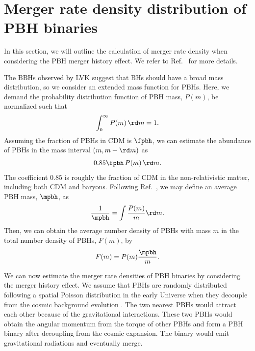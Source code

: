 \documentclass[
reprint,           %
superscriptaddress,%
amsmath,           %
amssymb,           %
aps,               %
prd,               %
notitlepage,       %
longbibliography,  %
floatfix,          %
nofootinbib,
]{revtex4-1}
\def\e{\begin{equation}}
\def\q{\end{equation}}
\begin{document}
\section{\label{merger}Merger rate density distribution of PBH binaries}

In this section, we will outline the calculation of merger rate density when considering the PBH merger history effect. We refer to Ref.~\cite{Liu:2019rnx} for more details.

The BBHs observed by LVK suggest that BHs should have a broad mass distribution, so we consider an extended mass function for PBHs. Here, we demand the probability distribution function of PBH mass, $P(m)$, be normalized such that
\e\label{norm}
\int_{0}^{\infty} P(m)\, \rd m = 1.
\q 
Assuming the fraction of PBHs in CDM is $\fpbh$, we can estimate the abundance of PBHs in the mass interval $(m, m+\rd m)$ as \cite{Chen:2018rzo}
\e 
0.85 \fpbh\, P(m)\, \rd m.
\q 
The coefficient $0.85$ is roughly the fraction of CDM in the non-relativistic matter, including both CDM and baryons. Following Ref.~\cite{Liu:2019rnx}, we may define an average PBH mass, $\mpbh$, as
\e\label{mpbh}
\frac{1}{\mpbh} = \int \frac{P(m)}{m} \rd m.
\q 
Then, we can obtain the average number density of PBHs with mass $m$ in the 
total number density of PBHs, $F(m)$, by \cite{Liu:2019rnx}
\e\label{Fm} 
F(m) = P(m) \frac{\mpbh}{m}.
\q 

We can now estimate the merger rate densities of PBH binaries by considering the merger history effect.
We assume that PBHs are randomly distributed following a spatial Poisson distribution in the early Universe when they decouple from the cosmic background evolution \cite{Nakamura:1997sm,Sasaki:2016jop,Ali-Haimoud:2017rtz}. The two nearest PBHs would attract each other because of the gravitational interactions. These two PBHs would obtain the angular momentum from the torque of other PBHs and form a PBH binary after decoupling from the cosmic expansion. The binary would emit gravitational radiations and eventually merge. 
\end{document}
